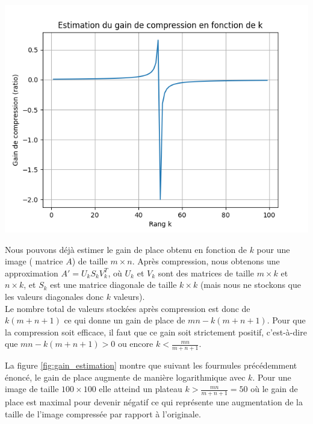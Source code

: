 \documentclass{article}
\begin{document}
\begin{minipage}{0.35\textwidth}
  \centering
  \includegraphics[width=\textwidth]{gain_estimation.png}
  \label{fig:gain_estimation}
\end{minipage}
\hfill
\begin{minipage}{0.62\textwidth}
Nous pouvons déjà estimer le gain de place obtenu en fonction de \( k \) pour une image ( matrice \( A \)) de taille \( m \times n \). Après compression, nous obtenons une approximation  $A' = U_k S_k V_k^T$, où $U_k$ et $V_k$ sont des matrices de taille $m \times k$ et $n \times k$, et $S_k$ est une matrice diagonale de taille $k \times k$ (mais nous ne stockons que les valeurs diagonales donc $k$ valeurs). \\
Le nombre total de valeurs stockées après compression est donc de \( k(m + n + 1)\) ce qui donne un gain de place de \( mn - k(m + n + 1) \). Pour que la compression soit efficace, il faut que ce gain soit strictement positif, c'est-à-dire que \( mn - k(m + n + 1) > 0 \) ou encore \( k < \frac{mn}{m + n + 1} \).
\end{minipage}
La figure \ref{fig:gain_estimation} montre que suivant les fourmules précédemment énoncé, le gain de place augmente de manière logarithmique avec \( k \). Pour une image de taille \( 100 \times 100 \) elle atteind un plateau $k > \frac{mn}{m + n + 1} = 50$ où le gain de place est maximal pour devenir négatif ce qui représente une augmentation de la taille de l'image compressée par rapport à l'originale.\\
\end{document}
